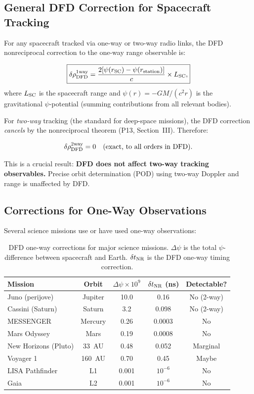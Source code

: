 \documentclass[aps,prd,twocolumn,superscriptaddress,nofootinbib]{revtex4-2}
\newcommand{\deltaT}{\delta t_{\rm NR}}
\begin{document}
\subsection{General DFD Correction for Spacecraft Tracking}

For any spacecraft tracked via one-way or two-way radio links, the
DFD nonreciprocal correction to the one-way range observable is:

\begin{equation}
\boxed{
\delta\rho_{\rm DFD}^{\rm 1way}
= \frac{2[\psi(r_{\rm SC}) - \psi(r_{\rm station})]}{c}\times L_{\rm SC},
}
\label{eq:pod_general}
\end{equation}
where $L_{\rm SC}$ is the spacecraft range and
$\psi(r) = -GM/(c^2 r)$ is the gravitational $\psi$-potential
(summing contributions from all relevant bodies).

For \emph{two-way} tracking (the standard for deep-space missions),
the DFD correction \emph{cancels} by the nonreciprocal theorem
(P13, Section~III). Therefore:

\begin{equation}
\delta\rho_{\rm DFD}^{\rm 2way} = 0
\quad\text{(exact, to all orders in DFD)}.
\label{eq:pod_2way}
\end{equation}

This is a crucial result: \textbf{DFD does not affect two-way
tracking observables.} Precise orbit determination (POD) using
two-way Doppler and range is unaffected by DFD.

\subsection{Corrections for One-Way Observations}

Several science missions use or have used one-way observations:

\begin{table}[h]
\caption{DFD one-way corrections for major science missions.
$\Delta\psi$ is the total $\psi$-difference between spacecraft
and Earth. $\deltaT$ is the DFD one-way timing correction.}
\label{tab:pod_corrections}
\begin{ruledtabular}
\begin{tabular}{lcccc}
Mission & Orbit & $\Delta\psi\times10^{9}$ &
$\deltaT$ (ns) & Detectable? \\
\hline
Juno (perijove) & Jupiter & 10.0 & 0.16 & No (2-way) \\
Cassini (Saturn) & Saturn & 3.2 & 0.098 & No (2-way) \\
MESSENGER & Mercury & 0.26 & 0.0003 & No \\
Mars Odyssey & Mars & 0.19 & 0.0008 & No \\
New Horizons (Pluto) & 33~AU & 0.48 & 0.052 & Marginal \\
Voyager 1 & 160~AU & 0.70 & 0.45 & Maybe \\
LISA Pathfinder & L1 & 0.001 & $10^{-6}$ & No \\
Gaia & L2 & 0.001 & $10^{-6}$ & No \\
\end{tabular}
\end{ruledtabular}
\end{table}
\end{document}
